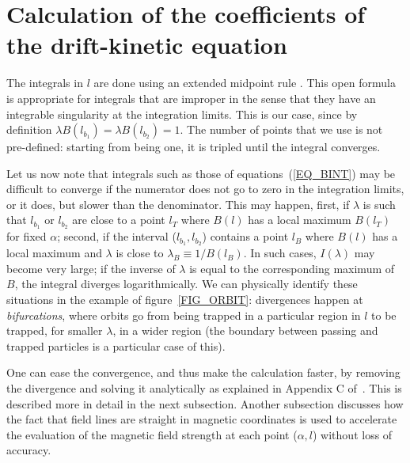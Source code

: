 
\section{Calculation of the coefficients of the drift-kinetic equation}\label{SEC_COEFFICIENTS}


The integrals in $l$ are done using an extended midpoint rule \citep[see e.g.][subroutine {\ttfamily midpnt}]{numericalrecipes}. This open formula is appropriate for integrals that are improper in the sense that they have an integrable singularity at the integration limits. This is our case, since by definition $\lambda B(l_{b_1}) = \lambda B(l_{b_2}) =1$. The number of points that we use is not pre-defined: starting from being one, it is tripled until the integral converges. %

Let us now note that integrals such as those of equations~(\ref{EQ_BINT}) may be difficult to converge if the numerator does not go to zero in the integration limits, or it does, but slower than the denominator. This may happen, first, if $\lambda$ is such that $l_{b_1}$ or $l_{b_2}$ are close to a point $l_T$ where $B(l)$ has a local maximum $B(l_T)$ for fixed $\alpha$; second, if the interval ($l_{b_1},l_{b_2}$) contains a point $l_B$ where $B(l)$ has a local maximum and $\lambda$ is close to $\lambda_B\equiv 1/B(l_B)$. In such cases, $I(\lambda)$ may become very large; if the inverse of $\lambda$  is equal to the corresponding maximum of $B$, the integral diverges logarithmically.  We can physically identify these situations in the example of figure~\ref{FIG_ORBIT}: divergences happen at \textit{bifurcations}, where orbits go from being trapped in a particular  region in $l$ to be trapped, for smaller $\lambda$, in a wider region (the boundary between passing and trapped particles is a particular case of this).  

One can ease the convergence, and thus make the calculation faster, by removing the divergence and solving it analytically as explained in Appendix C of~\citep{calvo2017sqrtnu}. This is described more in detail in the next subsection. Another subsection discusses how the fact that field lines are straight in magnetic coordinates is used to accelerate the evaluation of the magnetic field strength at each point ($\alpha, l$) without loss of accuracy.

